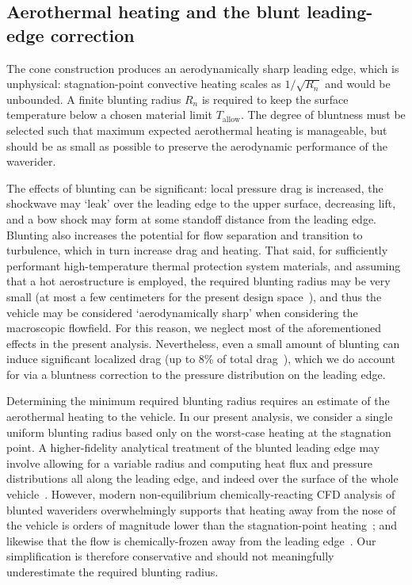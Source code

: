 \documentclass[10pt,a4paper]{article}
\begin{document}
\subsection{Aerothermal heating and the blunt leading-edge correction}\label{sec:blunting}

The cone construction produces an aerodynamically sharp leading edge, which is unphysical: stagnation-point convective heating scales as $1/\sqrt{R_n}$ and would be unbounded. A finite blunting radius $R_n$ is required to keep the surface temperature below a chosen material limit $T_{\text{allow}}$. The degree of bluntness must be selected such that maximum expected aerothermal heating is manageable, but should be as small as possible to preserve the aerodynamic performance of the waverider.

The effects of blunting can be significant: local pressure drag is increased, the shockwave may `leak' over the leading edge to the upper surface, decreasing lift, and a bow shock may form at some standoff distance from the leading edge. Blunting also increases the potential for flow separation and transition to turbulence, which in turn increase drag and heating. That said, for sufficiently performant high-temperature thermal protection system materials, and assuming that a hot aerostructure is employed, the required blunting radius may be very small (at most a few centimeters for the present design space~\cite{Bowcutt:1986,Anderson:2019}), and thus the vehicle may be considered `aerodynamically sharp' when considering the macroscopic flowfield. For this reason, we neglect most of the aforementioned effects in the present analysis. Nevertheless, even a small amount of blunting can induce significant localized drag (up to 8\% of total drag~\cite{Vanmol:1992}), which we do account for via a bluntness correction to the pressure distribution on the leading edge.

Determining the minimum required blunting radius requires an estimate of the aerothermal heating to the vehicle. In our present analysis, we consider a single uniform blunting radius based only on the worst-case heating at the stagnation point. A higher-fidelity analytical treatment of the blunted leading edge may involve allowing for a variable radius and computing heat flux and pressure distributions all along the leading edge, and indeed over the surface of the whole vehicle~\cite{Vanmol:1992}. However, modern non-equilibrium chemically-reacting CFD analysis of blunted waveriders overwhelmingly supports that heating away from the nose of the vehicle is orders of magnitude lower than the stagnation-point heating~\cite{Zhou:2025}; and likewise that the flow is chemically-frozen away from the leading edge~\cite{Anderson:1992}. Our simplification is therefore conservative and should not meaningfully underestimate the required blunting radius.
\end{document}
